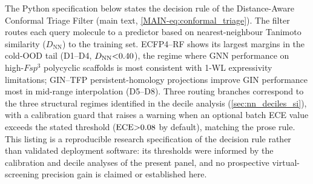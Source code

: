 \documentclass[11pt,a4paper]{article}
\begin{document}
The Python specification below states the decision rule of the Distance-Aware Conformal Triage Filter (main text, \cref{MAIN-eq:conformal_triage}). The filter routes each query molecule to a predictor based on nearest-neighbour Tanimoto similarity ($D_{\mathrm{NN}}$) to the training set. ECFP4--RF shows its largest margins in the cold-OOD tail (D1--D4, $D_{\mathrm{NN}}\num{<0.40}$), the regime where GNN performance on high-$Fsp^3$ polycyclic scaffolds is most consistent with 1-WL expressivity limitations; GIN--TFP persistent-homology projections improve GIN performance most in mid-range interpolation (D5--D8). Three routing branches correspond to the three structural regimes identified in the decile analysis (\cref{sec:nn_deciles_si}), with a calibration guard that raises a warning when an optional batch ECE value exceeds the stated threshold ($\mathrm{ECE} \num{>0.08}$ by default), matching the prose rule. This listing is a reproducible research specification of the decision rule rather than validated deployment software: its thresholds were informed by the calibration and decile analyses of the present panel, and no prospective virtual-screening precision gain is claimed or established here.
\end{document}
